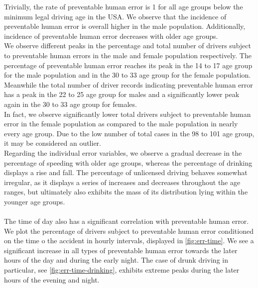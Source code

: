 \documentclass{article}
\theoremstyle{plain}
\theoremstyle{definition}
\theoremstyle{remark}
\begin{document}
Trivially, the rate of preventable human error is 1 for all age groups below the minimum legal driving age in the USA. We observe that the incidence of preventable human error is overall higher in the male population. Additionally, incidence of preventable human error decreases with older age groups.
\\
We observe different peaks in the percentage and total number of drivers subject to preventable human errors in the male and female population respectively. The percentage of preventable human error reaches its peak in the 14 to 17 age group for the male population and in the 30 to 33 age group for the female population. Meanwhile the total number of driver records indicating preventable human error has a peak in the 22 to 25 age group for males and a significantly lower peak again in the 30 to 33 age group for females.\\
In fact, we observe significantly lower total drivers subject to preventable human error in the female population as compared to the male population in nearly every age group. Due to the low number of total cases in the 98 to 101 age group, it may be considered an outlier.\\
Regarding the individual error variables, we observe a gradual decrease in the percentage of speeding with older age groups, whereas the percentage of drinking displays a rise and fall. The percentage of unlicensed driving behaves somewhat irregular, as it displays a series of increases and decreases throughout the age ranges, but ultimately also exhibits the mass of its distribution lying within the younger age groups.\\
\\
The time of day also has a significant correlation with preventable human error. We plot the percentage of drivers subject to preventable human error conditioned on the time o the accident in hourly intervals, displayed in \ref{fig:err-time}. We see a significant increase in all types of preventable human error towards the later hours of the day and during the early night. The case of drunk driving in particular, see \ref{fig:err-time-drinking}, exhibits extreme peaks during the later hours of the evening and night.
\end{document}
